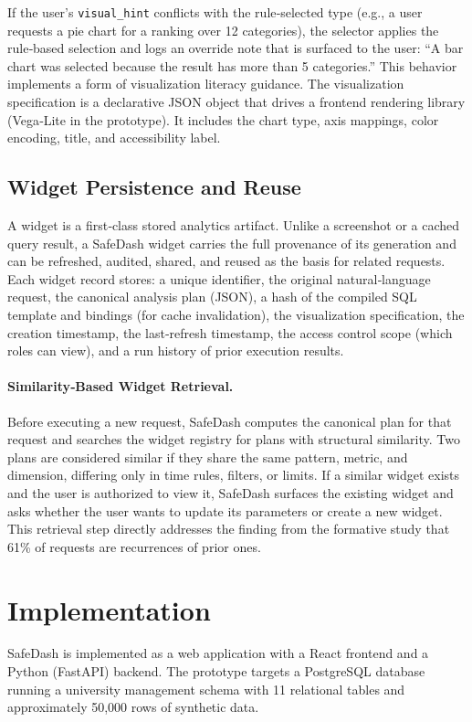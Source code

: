 \documentclass[11pt]{article}
\begin{document}
If the user's \texttt{visual\_hint} conflicts with the rule‑selected type (e.g., a user requests a pie chart for a ranking over 12 categories), the selector applies the rule‑based selection and logs an override note that is surfaced to the user: ``A bar chart was selected because the result has more than 5 categories.'' This behavior implements a form of visualization literacy guidance. The visualization specification is a declarative JSON object that drives a frontend rendering library (Vega‑Lite in the prototype). It includes the chart type, axis mappings, color encoding, title, and accessibility label.

\subsection{Widget Persistence and Reuse\label{sec:widget}}
A widget is a first‑class stored analytics artifact. Unlike a screenshot or a cached query result, a SafeDash widget carries the full provenance of its generation and can be refreshed, audited, shared, and reused as the basis for related requests. Each widget record stores: a unique identifier, the original natural‑language request, the canonical analysis plan (JSON), a hash of the compiled SQL template and bindings (for cache invalidation), the visualization specification, the creation timestamp, the last‑refresh timestamp, the access control scope (which roles can view), and a run history of prior execution results.

\paragraph{Similarity‑Based Widget Retrieval.} Before executing a new request, SafeDash computes the canonical plan for that request and searches the widget registry for plans with structural similarity. Two plans are considered similar if they share the same pattern, metric, and dimension, differing only in time rules, filters, or limits. If a similar widget exists and the user is authorized to view it, SafeDash surfaces the existing widget and asks whether the user wants to update its parameters or create a new widget. This retrieval step directly addresses the finding from the formative study that 61\% of requests are recurrences of prior ones.

\section{Implementation}
SafeDash is implemented as a web application with a React frontend and a Python (FastAPI) backend. The prototype targets a PostgreSQL database running a university management schema with 11 relational tables and approximately 50,000 rows of synthetic data.
\end{document}
